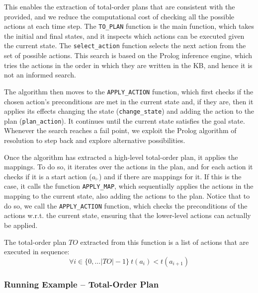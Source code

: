 This enables the extraction of total-order plans that are consistent with the \kb provided, and we reduce the computational cost of checking all the possible actions at each time step. The \texttt{TO\_PLAN} function is the main function, which takes the initial and final states, and it inspects which actions can be executed given the current state. The \texttt{select\_action} function selects the next action from the set of possible actions. This search is based on the Prolog inference engine, which tries the actions in the order in which they are written in the KB, and hence it is not an informed search. 

The algorithm then moves to the \texttt{APPLY\_ACTION} function, which first checks if the chosen action's preconditions are met in the current state and, if they are, then it applies its effects changing the state (\texttt{change\_state}) and adding the action to the plan (\texttt{plan\_action}). It continues until the current state satisfies the goal state. Whenever the search reaches a fail point, we exploit the Prolog algorithm of resolution to step back and explore alternative possibilities.

Once the algorithm has extracted a high-level total-order plan, it applies the mappings. To do so, it iterates over the actions in the plan, and for each action it checks if it is a start action ($a_\vdash$) and if there are mappings for it. If this is the case, it calls the function \texttt{APPLY\_MAP}, which sequentially applies the actions in the mapping to the current state, also adding the actions to the plan. Notice that to do so, we call the \texttt{APPLY\_ACTION} function, which checks the preconditions of the actions w.r.t. the current state, ensuring that the lower-level actions can actually be applied.

The total-order plan $TO$ extracted from this function is a list of actions that are executed in sequence:
\begin{equation*}
    \forall i \in \{0,\hdots \vert TO\vert-1\}~t(a_i)<t(a_{i+1})
\end{equation*}

\subsubsection{Running Example -- Total-Order Plan}
\label{sssec::runegTOPlan}

